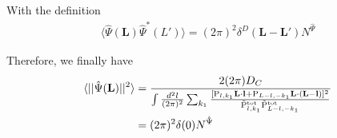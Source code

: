 \documentclass[12pt]{article}
\newcommand{\beq}{\begin{equation}}
\newcommand{\eeq}{\end{equation}}
\newcommand{\beqal}{\begin{aligned}}
\newcommand{\eeqal}{\end{aligned}}
\def\l{{\bf l}}
\def\L{{\bf L}}
\def\pul{{\rm P}}
\def\ptot{{\tilde{\rm P}^{\rm tot}}}
\def\d2l{\frac{d^2l}{(2\pi)^2}}
\def\dko{\frac{dk_1}{2\pi}}
\numberwithin{equation}{section}
\begin{document}
%
%
%
%
With the definition
\begin{eqnarray}
\langle \hat{\Psi}(\textbf{L}) \hat{\Psi}^*(L') \rangle  = (2\pi)^2 \delta^D(\textbf{L} - \textbf{L}') N^{\hat{\Psi}}
\end{eqnarray}

Therefore, we finally have
\beq
\beqal
\langle ||\hat{\Psi}(\L)||^2\rangle 
& =   \frac{2 (2\pi) D_C}{\int \frac{d^2 l}{(2\pi)^2} \sum_{k_1} \frac{[\pul_{l,k_1} \L\cdot \l +
		\pul_{L-l,-k_1} \L\cdot (\L-\l)]^2}{\ptot_{l,k_1}\ptot_{L-l,-k_1}} }
\\
& = (2\pi)^2 \delta(0) N^{\hat{\Psi}}
\eeqal
\eeq
\end{document}
